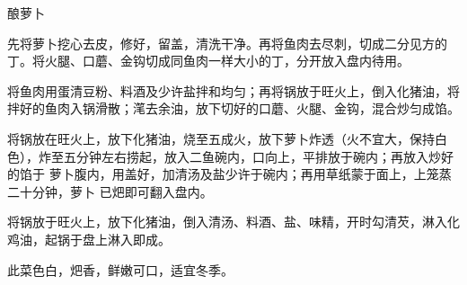 %
%
%
%
%
%
%
\begin{recipe}{酿萝卜}

\ingredients


\preparation

\step 先将萝卜挖心去皮，修好，留盖，清洗干净。再将鱼肉去尽刺，切成二分见方的
丁。将火腿、口蘑、金钩切成同鱼肉一样大小的丁，分开放入盘内待用。

\step 将鱼肉用蛋清豆粉、料酒及少许盐拌和均匀；再将锅放于旺火上，倒入化猪油，将
拌好的鱼肉入锅滑散；滗去余油，放下切好的口蘑、火腿、金钩，混合炒匀成馅。

\step 将锅放在旺火上，放下化猪油，烧至五成火，放下萝卜炸透（火不宜大，保持白
色），炸至五分钟左右捞起，放入二鱼碗内，口向上，平排放于碗内；再放入炒好的馅于
萝卜腹内，用盖好，加清汤及盐少许于碗内；再用草纸蒙于面上，上笼蒸二十分钟，萝卜
已𤆵即可翻入盘内。

\step 将锅放于旺火上，放下化猪油，倒入清汤、料酒、盐、味精，开时勾清芡，淋入化
鸡油，起锅于盘上淋入即成。

\features

此菜色白，𤆵香，鲜嫩可口，适宜冬季。

\end{recipe}

